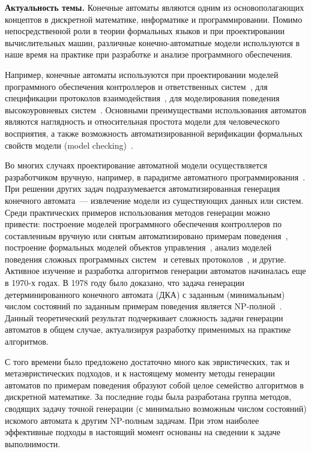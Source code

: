 \textbf{Актуальность темы.} 
Конечные автоматы являются одним из основополагающих концептов в дискретной математике, информатике и программировании.
Помимо непосредственной роли в теории формальных языков и при проектировании вычислительных машин, различные конечно-автоматные модели используются в наше время на практике при разработке и анализе программного обеспечения.

Например, конечные автоматы используются при проектировании моделей программного обеспечения контроллеров и ответственных систем~\cite{shalyto-automata-2010,DBLP:conf/setta/PatilDV15}, для спецификации протоколов взаимодействия~\cite{DBLP:conf/coordination/JongmansHA14}, для моделирования поведения высокоуровневых систем~\cite{DBLP:journals/ese/HeuleV13,wagner2006modeling}.
Основными преимуществами использования автоматов являются наглядность и относительная простота модели для человеческого восприятия, а также возможность автоматизированной верификации формальных свойств модели (model checking)~\cite{clarke2018model}.

Во многих случаях проектирование автоматной модели осуществляется разработчиком вручную, например, в парадигме автоматного программирования~\cite{shalyto-automata-2010}.
При решении других задач подразумевается автоматизированная генерация конечного автомата~--- извлечение модели из существующих данных или систем.
Среди практических примеров использования методов генерации можно привести: построение моделей программного обеспечения контроллеров по составленным вручную или снятым автоматизировано примерам поведения~\cite{DBLP:conf/etfa/ChivilikhinBUSS18}, построение формальных моделей объектов управления~\cite{DBLP:conf/etfa/BuzhinskyV17,DBLP:journals/tii/BuzhinskyV17}, анализ моделей поведения сложных программных систем~\cite{DBLP:journals/tosem/CookW98,DBLP:conf/sigsoft/BertolinoIPT09,DBLP:journals/ese/HeuleV13} и сетевых протоколов~\cite{DBLP:conf/sp/SivakornAPKJ17}, и другие.
Активное изучение и разработка алгоритмов генерации автоматов начиналась еще в 1970-х годах.
В 1978 году было доказано, что задача генерации детерминированного конечного автомата (ДКА) с заданным (минимальным) числом состояний по заданным примерам поведения является NP-полной~\cite{DBLP:journals/iandc/Gold78}.
Данный теоретический результат подчеркивает сложность задачи генерации автоматов в общем случае, актуализируя разработку применимых на практике алгоритмов.

С того времени было предложено достаточно много как эвристических, так и метаэвристических подходов, и к настоящему моменту методы генерации автоматов по примерам поведения образуют собой целое семейство алгоритмов в дискретной математике.
За последние годы была разработана группа методов, сводящих задачу точной генерации (с минимально возможным числом состояний) искомого автомата к другим NP-полным задачам.
При этом наиболее эффективные подходы в настоящий момент основаны на сведении к задаче выполнимости.

